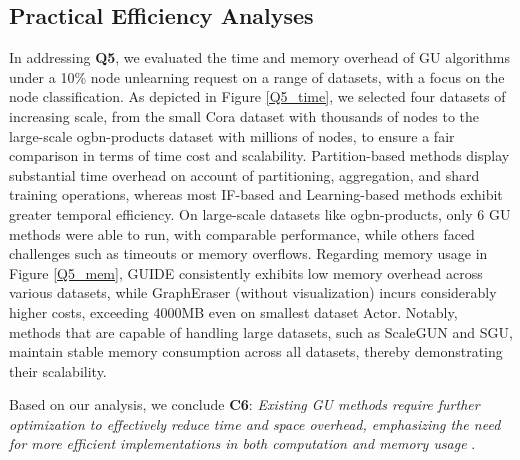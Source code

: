 \subsection{Practical Efficiency Analyses}
In addressing \textbf{Q5}, we evaluated the time and memory overhead of GU algorithms under a 10\% node unlearning request on a range of datasets, with a focus on the node classification. As depicted in Figure \ref{Q5_time}, we selected four datasets of increasing scale, from the small Cora dataset with thousands of nodes to the large-scale ogbn-products dataset with millions of nodes, to ensure a fair comparison in terms of time cost and scalability. Partition-based methods display substantial time overhead on account of partitioning, aggregation, and shard training operations, whereas most IF-based and Learning-based methods exhibit greater temporal efficiency. On large-scale datasets like ogbn-products, only $6$ GU methods were able to run, with comparable performance, while others faced challenges such as timeouts or memory overflows. Regarding memory usage in Figure \ref{Q5_mem}, GUIDE consistently exhibits low memory overhead across various datasets, while GraphEraser (without visualization) incurs considerably higher costs, exceeding 4000MB even on smallest dataset Actor. Notably, methods that are capable of handling large datasets, such as ScaleGUN and SGU, maintain stable memory consumption across all datasets, thereby demonstrating their scalability. 

Based on our analysis, we conclude \textbf{C6}: \textit{Existing GU methods require further optimization to effectively reduce time and space overhead, emphasizing the need for more efficient implementations in both computation and memory usage} \cite{Efficient3,Efficient4}.

